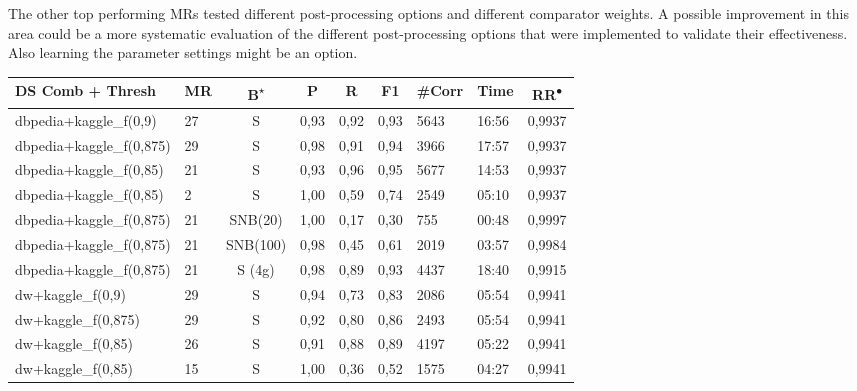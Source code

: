 \documentclass[11pt,titlepage,oneside,openany]{article}
\begin{document}
The other top performing MRs tested different post-processing options and different comparator weights. A possible improvement in this area could be a more systematic evaluation of the different post-processing options that were implemented to validate their effectiveness. Also learning the parameter settings might be an option.



\begin{table}[]
	\small
	\begin{tabular}{llcllllll}
		\textbf{DS Comb   + Thresh} & \multicolumn{1}{c}{\textbf{MR}} & \textbf{B\textsuperscript{$\star$}} & \multicolumn{1}{c}{\textbf{P}} & \multicolumn{1}{c}{\textbf{R}} & \multicolumn{1}{c}{\textbf{F1}} & \multicolumn{1}{c}{\textbf{\#Corr}} & \multicolumn{1}{c}{\textbf{Time}} & \multicolumn{1}{c}{\textbf{RR\textsuperscript{$\bullet$}}} \\\hline
		dbpedia+kaggle\_f(0,9)   & 27 & S        & 0,93 & 0,92 & 0,93 & 5643 & 16:56 & 0,9937 \\
		\rowcolor[HTML]{FFFFCC} 
		dbpedia+kaggle\_f(0,875) & 29 & S        & 0,98 & 0,91 & 0,94 & 3966 & 17:57 & 0,9937 \\
		dbpedia+kaggle\_f(0,85)  & 21 & S        & 0,93 & 0,96 & 0,95 & 5677 & 14:53 & 0,9937 \\
		\rowcolor[HTML]{FCCCC8} 
		dbpedia+kaggle\_f(0,85)  & 2  & S        & 1,00 & 0,59 & 0,74 & 2549 & 05:10 & 0,9937 \\
		\rowcolor[HTML]{DDEBF7} 
		dbpedia+kaggle\_f(0,875) & 21 & SNB(20)  & 1,00 & 0,17 & 0,30 & 755  & 00:48 & 0,9997 \\
		\rowcolor[HTML]{DDEBF7} 
		dbpedia+kaggle\_f(0,875) & 21 & SNB(100) & 0,98 & 0,45 & 0,61 & 2019 & 03:57 & 0,9984 \\
		\rowcolor[HTML]{DDEBF7} 
		dbpedia+kaggle\_f(0,875) & 21 & S (4g)   & 0,98 & 0,89 & 0,93 & 4437 & 18:40 & 0,9915 \\\hline\hline
		\rowcolor[HTML]{FFFFCC} 
		dw+kaggle\_f(0,9)        & 29 & S        & 0,94 & 0,73 & 0,83 & 2086 & 05:54 & 0,9941 \\
		dw+kaggle\_f(0,875)      & 29 & S        & 0,92 & 0,80 & 0,86 & 2493 & 05:54 & 0,9941 \\
		dw+kaggle\_f(0,85)       & 26 & S        & 0,91 & 0,88 & 0,89 & 4197 & 05:22 & 0,9941 \\
		\rowcolor[HTML]{FCCCC8} 
		dw+kaggle\_f(0,85)       & 15 & S        & 1,00 & 0,36 & 0,52 & 1575 & 04:27 & 0,9941 \\\hline\hline

\end{tabular}
\end{table}
\end{document}
